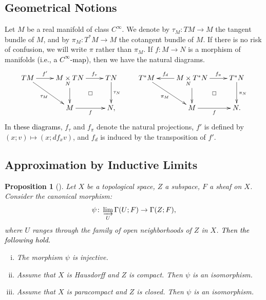 ﻿\documentclass[a4paper,leqno,dvipdfmx]{jsarticle}
\newtheorem{Proposition+}[Axiom+]{Proposition}
\theoremstyle{definition}
\numberwithin{equation}{section}
\newcommand{\indlim}[1][]{\mathop{\varinjlim}\limits_{#1}}
\newcommand{\dpb}[1][]{\mathbin{\mathop{\times}\limits_{#1}}}
\theoremstyle{mystyle}
\newcommand{\mpb}[1][]{{#1}_{\pi}} %
\newcommand{\mdiff}[1][]{{#1}_{d}} %
\newcommand{\mptan}[1][]{{#1}_{\tau}} %
\newcommand{\cotb}[1][]{T^{\ast}{#1}}
\begin{document}
\subsection{Geometrical Notions}
Let \(M\) be a real manifold of class \(C^\infty\). 
We denote by \(\tau_{M}\colon TM\to M\) 
the tangent bundle of \(M\), 
and by \(\pi_{M}\colon \cotb[M] \to M\) 
the cotangent bundle of \(M\). 
If there is no risk of confusion, 
we will write \(\pi\) rather than \(\pi_{M}\). 
If \(f\colon M\to N\) is a morphism of manifolds 
\textcolor{black}{(i.e., a \(C^{\infty}\)-map)}, 
then we have the natural diagram\textcolor{black}{s}. 
\[\vcenter{\xymatrix{
  TM
    \ar[r]^-{f'}
    \ar[rd]_-{\tau_M} 
  &
  M\dpb[N]TN
    \ar[r]^-{\mptan[f]}
    \ar[d]
    \ar@{}[dr]|\square
  & 
  TN
    \ar[d]^-{\tau_N}
  &
  \cotb[M]
    \ar[rd]_-{\pi_M}
  &
  M\dpb[N]\cotb[N]
    \ar[l]_-{\mdiff[f]}
    \ar[r]^-{\mpb[f]}
    \ar[d]
    \ar@{}[dr]|\square
  &
  \cotb[N]
    \ar[d]^{\pi_N}
  \\
  &
  M
    \ar[r]_-{f}
  &
  N,
  &
  &
  M
    \ar[r]_-{f}
  &
  N.
}}\]
In \textcolor{black}{these diagrams}, 
\(\mptan[f]\) and \(\mpb[f]\) denote 
the natural projections\textcolor{black}{,} \(f'\) is defined by 
\((x;v)\mapsto (x;df_{x}v)\), 
and \(\mdiff[f]\) is induced by the transposition of \(f'\). 

\subsection{Approximation by Inductive Limits}

\begin{Proposition+}[{\cite[Proposition 2.5.1]{KS90}}]\label{prop:ks2.5.1}
  Let \(X\) be a topological space, 
  \(Z\) a subspace, \(F\) a sheaf on \(X\). 
  Consider the canonical morphism:
  \[
    \psi\colon \indlim[U]\Gamma(U;F)
    \to 
    \Gamma(Z;F),
  \]
  where \(U\) ranges through the family of 
  open neighborhoods of \(Z\) in \(X\). 
  \textcolor{black}{Then the following hold.}
  \begin{enumerate}[(i)]
    \item The morphism \(\psi\) is injective. 
    \item Assume that \(X\) is Hausdorff and \(Z\) is compact. 
    Then \(\psi\) is an isomorphism.
    \item Assume that \(X\) is paracompact and \(Z\) is closed. 
    Then \(\psi\) is an isomorphism.
  \end{enumerate}
\end{Proposition+}
\end{document}
